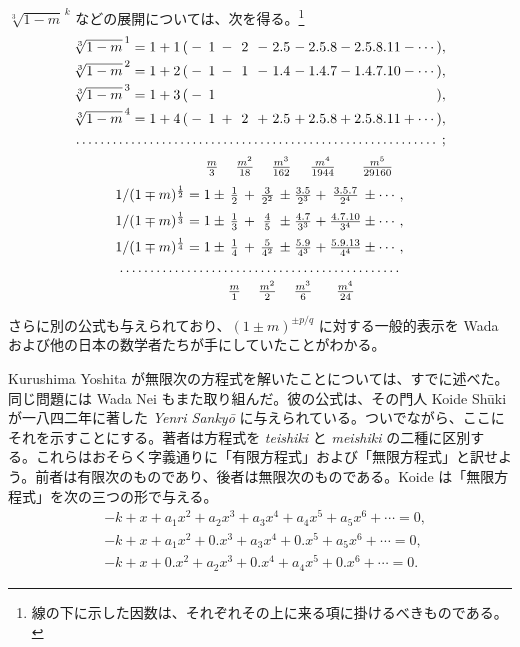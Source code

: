 \documentclass[11pt]{article}
\newcommand{\scanpage}[2]{\clearpage\setcounter{footnote}{0}\noindent{\footnotesize\color{gray}PDF #1 頁 · #2}\par\medskip}
\begin{document}
\scanpage{0289}{印刷頁 275}
$\sqrt[3]{1-m}^{\,k}$ などの展開については、次を得る。\footnote{線の下に示した因数は、それぞれその上に来る項に掛けるべきものである。}
\[
\begin{array}{l@{}c@{}c@{}c@{}c@{}c@{}c@{}c@{}c@{}c@{}c@{}r}
\sqrt[3]{1-m}^{\,1} = 1 + 1\,( & {}-{} & 1 & {}-{} & 2 & {}-{} & 2.5 & {}-{} & 2.5.8 & {}-{} & 2.5.8.11 & {}-\cdots), \\[1mm]
\sqrt[3]{1-m}^{\,2} = 1 + 2\,( & {}-{} & 1 & {}-{} & 1 & {}-{} & 1.4 & {}-{} & 1.4.7 & {}-{} & 1.4.7.10 & {}-\cdots), \\[1mm]
\sqrt[3]{1-m}^{\,3} = 1 + 3\,( & {}-{} & 1 & & & & & & & & & ), \\[1mm]
\sqrt[3]{1-m}^{\,4} = 1 + 4\,( & {}-{} & 1 & {}+{} & 2 & {}+{} & 2.5 & {}+{} & 2.5.8 & {}+{} & 2.5.8.11 & {}+\cdots), \\[1mm]
\multicolumn{12}{c}{\dotfill\;;} \\[2mm]
 & & \frac{m}{3} & & \frac{m^2}{18} & & \frac{m^3}{162} & & \frac{m^4}{1944} & & \frac{m^5}{29160} &
\end{array}
\]
\[
\begin{array}{r@{}c@{}c@{}c@{}c@{}c@{}c@{}c@{}c@{}l}
1/(1\mp m)^{\frac{1}{2}} = 1 & {}\pm{} & \frac{1}{2} & {}+{} & \frac{3}{2^2} & {}\pm{} & \frac{3.5}{2^3} & {}+{} & \frac{3.5.7}{2^4} & {}\pm\cdots, \\[2mm]
1/(1\mp m)^{\frac{1}{3}} = 1 & {}\pm{} & \frac{1}{3} & {}+{} & \frac{4}{5} & {}\pm{} & \frac{4.7}{3^3} & {}+{} & \frac{4.7.10}{3^4} & {}\pm\cdots, \\[2mm]
1/(1\mp m)^{\frac{1}{4}} = 1 & {}\pm{} & \frac{1}{4} & {}+{} & \frac{5}{4^2} & {}\pm{} & \frac{5.9}{4^3} & {}+{} & \frac{5.9.13}{4^4} & {}\pm\cdots, \\[1mm]
\multicolumn{10}{c}{\dotfill} \\[1mm]
 & & \frac{m}{1} & & \frac{m^2}{2} & & \frac{m^3}{6} & & \frac{m^4}{24} &
\end{array}
\]

さらに別の公式も与えられており、$(1 \pm m)^{\pm p/q}$ に対する一般的表示を Wada および他の日本の数学者たちが手にしていたことがわかる。

Kurushima Yoshita が無限次の方程式を解いたことについては、すでに述べた。同じ問題には Wada Nei もまた取り組んだ。彼の公式は、その門人 Koide Shūki が一八四二年に著した \emph{Yenri Sankyō} に与えられている。ついでながら、ここにそれを示すことにする。著者は方程式を \emph{teishiki} と \emph{meishiki} の二種に区別する。これらはおそらく字義通りに「有限方程式」および「無限方程式」と訳せよう。前者は有限次のものであり、後者は無限次のものである。Koide は「無限方程式」を次の三つの形で与える。
\[
\begin{aligned}
&-k + x + a_1x^2 + a_2x^3 + a_3x^4 + a_4x^5 + a_5x^6 + \cdots = 0,\\
&-k + x + a_1x^2 + 0.x^3 + a_3x^4 + 0.x^5 + a_5x^6 + \cdots = 0,\\
&-k + x + 0.x^2 + a_2x^3 + 0.x^4 + a_4x^5 + 0.x^6 + \cdots = 0.
\end{aligned}
\]
\end{document}
